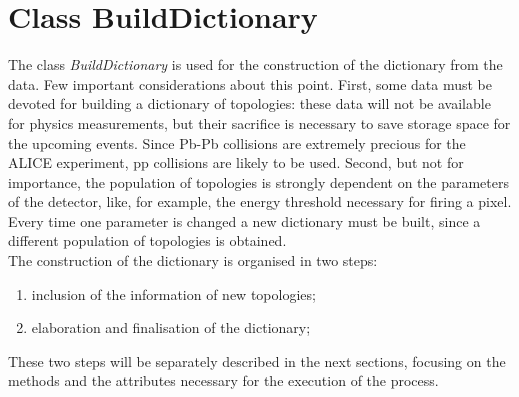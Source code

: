 \section{Class BuildDictionary}
The class \textit{BuildDictionary} is used for the construction of the dictionary from the data. Few important considerations about this point. First, some data must be devoted for building a dictionary of topologies: these data will not be available for physics measurements, but their sacrifice is necessary to save storage space for the upcoming events. Since Pb-Pb collisions are extremely precious for the ALICE experiment, pp collisions are likely to be used. Second, but not for importance, the population of topologies is strongly dependent on the parameters of the detector, like, for example, the energy threshold necessary for firing a pixel. Every time one parameter is changed a new dictionary must be built, since a different population of topologies is obtained.\\
The construction of the dictionary is organised in two steps:
\begin{enumerate}
 \item inclusion of the information of new topologies;
 \item elaboration and finalisation of the dictionary;
\end{enumerate}
These two steps will be separately described in the next sections, focusing on the methods and the attributes necessary for the execution of the process.
